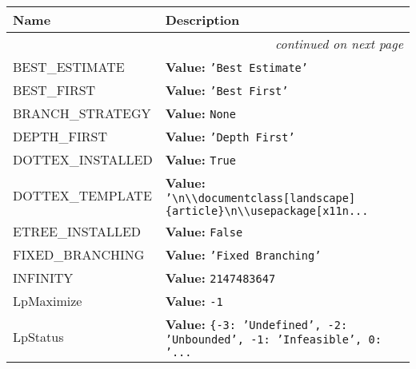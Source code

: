     \vspace{-1cm}
\hspace{\varindent}\begin{longtable}{|p{\varnamewidth}|p{\vardescrwidth}|l}
\cline{1-2}
\cline{1-2} \centering \textbf{Name} & \centering \textbf{Description}& \\
\cline{1-2}
\endhead\cline{1-2}\multicolumn{3}{r}{\small\textit{continued on next page}}\\\endfoot\cline{1-2}
\endlastfoot\raggedright B\-E\-S\-T\-\_\-E\-S\-T\-I\-M\-A\-T\-E\- & \raggedright \textbf{Value:} 
{\tt \texttt{'}\texttt{Best Estimate}\texttt{'}}&\\
\cline{1-2}
\raggedright B\-E\-S\-T\-\_\-F\-I\-R\-S\-T\- & \raggedright \textbf{Value:} 
{\tt \texttt{'}\texttt{Best First}\texttt{'}}&\\
\cline{1-2}
\raggedright B\-R\-A\-N\-C\-H\-\_\-S\-T\-R\-A\-T\-E\-G\-Y\- & \raggedright \textbf{Value:} 
{\tt None}&\\
\cline{1-2}
\raggedright D\-E\-P\-T\-H\-\_\-F\-I\-R\-S\-T\- & \raggedright \textbf{Value:} 
{\tt \texttt{'}\texttt{Depth First}\texttt{'}}&\\
\cline{1-2}
\raggedright D\-O\-T\-2\-T\-E\-X\-\_\-I\-N\-S\-T\-A\-L\-L\-E\-D\- & \raggedright \textbf{Value:} 
{\tt True}&\\
\cline{1-2}
\raggedright D\-O\-T\-2\-T\-E\-X\-\_\-T\-E\-M\-P\-L\-A\-T\-E\- & \raggedright \textbf{Value:} 
{\tt \texttt{'}\texttt{{\textbackslash}n{\textbackslash}{\textbackslash}documentclass[landscape]\{article\}{\textbackslash}n{\textbackslash}{\textbackslash}usepackage[x11n}\texttt{...}}&\\
\cline{1-2}
\raggedright E\-T\-R\-E\-E\-\_\-I\-N\-S\-T\-A\-L\-L\-E\-D\- & \raggedright \textbf{Value:} 
{\tt False}&\\
\cline{1-2}
\raggedright F\-I\-X\-E\-D\-\_\-B\-R\-A\-N\-C\-H\-I\-N\-G\- & \raggedright \textbf{Value:} 
{\tt \texttt{'}\texttt{Fixed Branching}\texttt{'}}&\\
\cline{1-2}
\raggedright I\-N\-F\-I\-N\-I\-T\-Y\- & \raggedright \textbf{Value:} 
{\tt 2147483647}&\\
\cline{1-2}
\raggedright L\-p\-M\-a\-x\-i\-m\-i\-z\-e\- & \raggedright \textbf{Value:} 
{\tt -1}&\\
\cline{1-2}
\raggedright L\-p\-S\-t\-a\-t\-u\-s\- & \raggedright \textbf{Value:} 
{\tt \texttt{\{}-3\texttt{: }\texttt{'}\texttt{Undefined}\texttt{'}\texttt{, }-2\texttt{: }\texttt{'}\texttt{Unbounded}\texttt{'}\texttt{, }-1\texttt{: }\texttt{'}\texttt{Infeasible}\texttt{'}\texttt{, }0\texttt{: }\texttt{'}\texttt{...}}&\\

\end{longtable}

